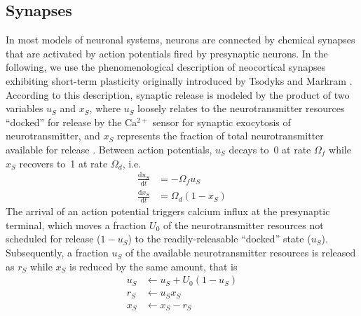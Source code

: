 \documentclass[a4paper, 11pt]{article}
\newcommand{\der}[2]{\frac{\mathrm{d}#1}{\mathrm{d}#2}}
\begin{document}
\subsection{Synapses} \label{sec:synapses}
In most models of neuronal systems, neurons are connected by chemical synapses that are activated by action potentials fired by presynaptic neurons.
In the following, we use the phenomenological description of neocortical synapses exhibiting short-term plasticity originally introduced by Tsodyks and Markram \citep{Tsodyks1998,Tsodyks_LesHouches2005}.
According to this description, synaptic release is modeled by the product of two variables $u_S$ and $x_S$, where $u_S$ loosely relates to the neurotransmitter resources ``docked'' for release by the Ca$^{2+}$ sensor for synaptic exocytosis of neurotransmitter, and $x_S$ represents the fraction of total neurotransmitter available for release \citep{FuhrmannTsodyks_JNeurophys2002,Tsodyks_LesHouches2005}.
Between action potentials, $u_S$ decays to~0 at rate $\Omega_f$ while $x_S$ recovers to~1 at rate $\Omega_d$, i.e.
\begin{align}
\der{u_S}{t} &= -\Omega_f u_S \label{eq:synapse-us}\\
\der{x_S}{t} &= \Omega_d (1 - x_S) \label{eq:synapse-xs}
\end{align}
The arrival of an action potential triggers calcium influx at the presynaptic terminal, which moves a fraction $U_0$ of the neurotransmitter resources not scheduled for release ($1-u_S$)  to the readily-releasable ``docked'' state ($u_S$).
Subsequently, a fraction $u_S$ of the available neurotransmitter resources is released as $r_S$ while $x_S$ is reduced by the same amount, that is
\begin{align}
u_S &\leftarrow u_S + U_0 \left(1 - u_S\right)\label{eq:u_S}\\
r_S &\leftarrow u_S x_S \label{eq:rs}\\
x_S &\leftarrow x_S - r_S
\end{align}
\end{document}
